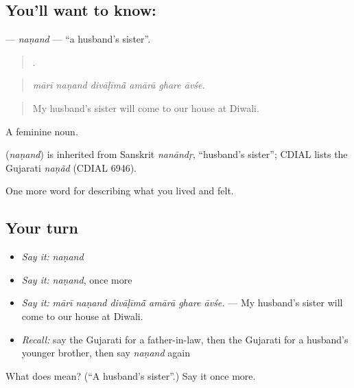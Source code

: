 \subsection*{You'll want to know: }
\textbf{} — \emph{naṇand} — \textquotedblleft{}a husband's sister\textquotedblright{}.

\begin{quote}
     .
\end{quote}

\begin{quote}
\emph{mārī naṇand divāḷīmā̃ amārā ghare āvśe.}
\end{quote}

\begin{quote}
My husband's sister will come to our house at Diwali.
\end{quote}

A feminine noun.

\begin{cousinweb}
\textbf{} (\emph{naṇand}) is inherited from Sanskrit \emph{nanāndṛ}, \textquotedblleft{}husband's sister\textquotedblright{}; CDIAL lists the Gujarati \emph{naṇãd} (CDIAL 6946).
\end{cousinweb}

\begin{grammarlens}[title={What you've built}]
One more word for describing what you lived and felt.
\end{grammarlens}

\subsection*{Your turn}
\begin{itemize}
\raggedright
  \item \emph{Say it:} \emph{naṇand}
  \item \emph{Say it:} \emph{naṇand}, once more
  \item \emph{Say it:} \emph{mārī naṇand divāḷīmā̃ amārā ghare āvśe.} — My husband's sister will come to our house at Diwali.
  \item \emph{Recall:} say the Gujarati for a father-in-law, then the Gujarati for a husband's younger brother, then say \emph{naṇand} again
\end{itemize}

\begin{tcolorbox}[breakable,colback=teal!4,colframe=teal!35!black,title={Before you move on}]
What does  mean? (\textquotedblleft{}A husband's sister\textquotedblright{}.) Say it once more.
\end{tcolorbox}
